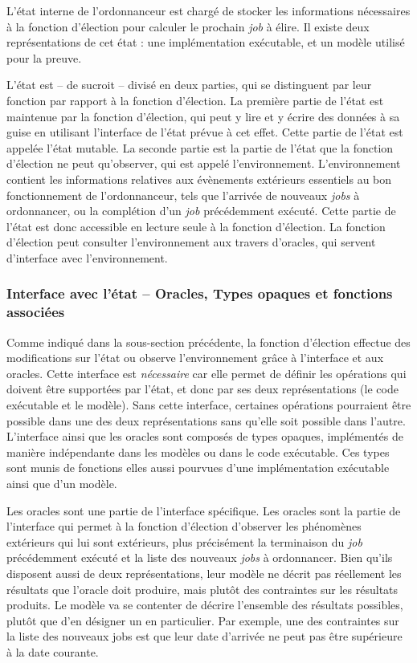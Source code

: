 			L'état interne de l'ordonnanceur est chargé de stocker les informations nécessaires à la fonction d'élection pour calculer le prochain \emph{job} à élire. Il existe deux représentations de cet état : une implémentation exécutable, et un modèle utilisé pour la preuve.

			L'état est -- de sucroit -- divisé en deux parties, qui se distinguent par leur fonction par rapport à la fonction d'élection. La première partie de l'état est maintenue par la fonction d'élection, qui peut y lire et y écrire des données à sa guise en utilisant l'interface de l'état prévue à cet effet. Cette partie de l'état est appelée l'état mutable. La seconde partie est la partie de l'état que la fonction d'élection ne peut qu'observer, qui est appelé l'environnement. L'environnement contient les informations relatives aux évènements extérieurs essentiels au bon fonctionnement de l'ordonnanceur, tels que l'arrivée de nouveaux \emph{jobs} à ordonnancer, ou la complétion d'un \emph{job} précédemment exécuté. Cette partie de l'état est donc accessible en lecture seule à la fonction d'élection. La fonction d'élection peut consulter l'environnement aux travers d'oracles, qui servent d'interface avec l'environnement.

		\subsubsection{Interface avec l'état -- Oracles, Types opaques et fonctions associées}
			
			Comme indiqué dans la sous-section précédente, la fonction d'élection effectue des modifications sur l'état ou observe l'environnement grâce à l'interface et aux oracles. Cette interface est \emph{nécessaire} car elle permet de définir les opérations qui doivent être supportées par l'état, et donc par ses deux représentations (le code exécutable et le modèle). Sans cette interface, certaines opérations pourraient être possible dans une des deux représentations sans qu'elle soit possible dans l'autre.
			L'interface ainsi que les oracles sont composés de types opaques, implémentés de manière indépendante dans les modèles ou dans le code exécutable. Ces types sont munis de fonctions elles aussi pourvues d'une implémentation exécutable ainsi que d'un modèle.

			Les oracles sont une partie de l'interface spécifique. Les oracles sont la partie de l'interface qui permet à la fonction d'élection d'observer les phénomènes extérieurs qui lui sont extérieurs, plus précisément la terminaison du \emph{job} précédemment exécuté et la liste des nouveaux \emph{jobs} à ordonnancer. Bien qu'ils disposent aussi de deux représentations, leur modèle ne décrit pas réellement les résultats que l'oracle doit produire, mais plutôt des contraintes sur les résultats produits. Le modèle va se contenter de décrire l'ensemble des résultats possibles, plutôt que d'en désigner un en particulier. Par exemple, une des contraintes sur la liste des nouveaux jobs est que leur date d'arrivée ne peut pas être supérieure à la date courante. 

